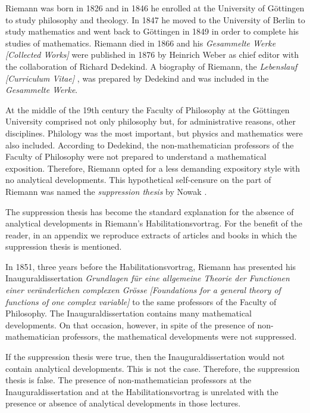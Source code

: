 \documentclass[12pt]{article}
\begin{document}
Riemann was born in 1826 and in 1846 he enrolled at the University of G\"ottingen to study philosophy and theology. In 1847 he moved to the University of Berlin to study mathematics and went back to G\"ottingen in 1849 in order to complete his studies of mathematics. Riemann died in 1866 and his {\it Gesammelte Werke} {\it [Collected Works]} \cite{Riemann1876} were published in 1876 by Heinrich Weber as chief editor with the collaboration of Richard Dedekind. A biography of Riemann, the {\it Lebenslauf} {\it [Curriculum Vitae]} \cite{Dedekind1876b}, was prepared by Dedekind and was included in the {\it Gesammelte Werke}.

At the middle of the 19th century the Faculty of Philosophy at the G\"ottingen University comprised not only philosophy but, for administrative reasons, other disciplines. Philology was the most important, but physics and mathematics were also included. According to Dedekind, the non-mathematician professors of the Faculty of Philosophy were not prepared to understand a mathematical exposition. Therefore, Riemann opted for a less demanding expository style with no analytical developments. This hypothetical self-censure on the part of Riemann was named the {\it suppression thesis} by Nowak \cite{Nowak1989}. 

The suppression thesis has become the standard explanation for the absence of analytical developments in Riemann's Habilitationsvortrag. For the benefit of the reader, in an appendix we reproduce extracts of articles and books in which the suppression thesis is mentioned.

In 1851, three years before the Habilitationsvortrag, Riemann has presented his Inauguraldissertation {\it Grundlagen f\"ur eine allgemeine Theorie der Functionen einer ver\"anderlichen complexen Gr\"osse} {\it [Foundations for a general theory of functions of one complex variable]} \cite{Riemann1851} to the same professors of the Faculty of Philosophy. The Inauguraldissertation contains many mathematical developments. On that occasion, however, in spite of the presence of non-mathematician professors, the mathematical developments were not suppressed. 

If the suppression thesis were true, then the Inauguraldissertation would not contain analytical developments. This is not the case. Therefore, the suppression thesis is false. The presence of non-mathematician professors at the Inauguraldissertation and at the  Habilitationsvortrag is unrelated with the presence or absence of analytical developments in those lectures. 
\end{document}

